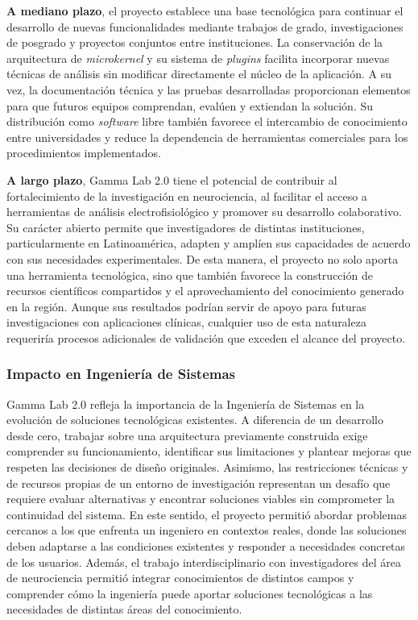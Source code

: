 \documentclass[12pt,letterpaper,oneside]{article}
\begin{document}
\textbf{A mediano plazo}, el proyecto establece una base tecnológica para continuar el desarrollo de nuevas funcionalidades mediante trabajos de grado, investigaciones de posgrado y proyectos conjuntos entre instituciones. La conservación de la arquitectura de \textit{microkernel} y su sistema de \textit{plugins} facilita incorporar nuevas técnicas de análisis sin modificar directamente el núcleo de la aplicación. A su vez, la documentación técnica y las pruebas desarrolladas proporcionan elementos para que futuros equipos comprendan, evalúen y extiendan la solución. Su distribución como \textit{software} libre también favorece el intercambio de conocimiento entre universidades y reduce la dependencia de herramientas comerciales para los procedimientos implementados.

\textbf{A largo plazo}, Gamma Lab 2.0 tiene el potencial de contribuir al fortalecimiento de la investigación en neurociencia, al facilitar el acceso a herramientas de análisis electrofisiológico y promover su desarrollo colaborativo. Su carácter abierto permite que investigadores de distintas instituciones, particularmente en Latinoamérica, adapten y amplíen sus capacidades de acuerdo con sus necesidades experimentales. De esta manera, el proyecto no solo aporta una herramienta tecnológica, sino que también favorece la construcción de recursos científicos compartidos y el aprovechamiento del conocimiento generado en la región. Aunque sus resultados podrían servir de apoyo para futuras investigaciones con aplicaciones clínicas, cualquier uso de esta naturaleza requeriría procesos adicionales de validación que exceden el alcance del proyecto.

\subsubsection{Impacto en Ingeniería de Sistemas}

Gamma Lab 2.0 refleja la importancia de la Ingeniería de Sistemas en la evolución de soluciones tecnológicas existentes. A diferencia de un desarrollo desde cero, trabajar sobre una arquitectura previamente construida exige comprender su funcionamiento, identificar sus limitaciones y plantear mejoras que respeten las decisiones de diseño originales. Asimismo, las restricciones técnicas y de recursos propias de un entorno de investigación representan un desafío que requiere evaluar alternativas y encontrar soluciones viables sin comprometer la continuidad del sistema. En este sentido, el proyecto permitió abordar problemas cercanos a los que enfrenta un ingeniero en contextos reales, donde las soluciones deben adaptarse a las condiciones existentes y responder a necesidades concretas de los usuarios. Además, el trabajo interdisciplinario con investigadores del área de neurociencia permitió integrar conocimientos de distintos campos y comprender cómo la ingeniería puede aportar soluciones tecnológicas a las necesidades de distintas áreas del conocimiento.
\end{document}
